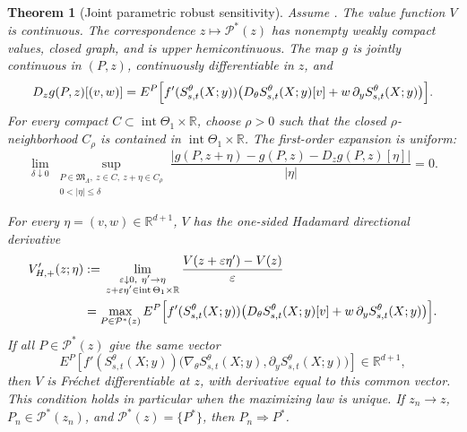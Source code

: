 \documentclass[11pt,reqno]{amsart}
\theoremstyle{plain}
\newtheorem{theorem}{Theorem}[section]
\theoremstyle{definition}
\newcommand{\R}{\mathbb R}
\newcommand{\cP}{\mathcal P}
\newcommand{\eps}{\varepsilon}
\newcommand{\abs}[1]{\left\lvert #1\right\rvert}
\begin{document}
\begin{theorem}[Joint parametric robust sensitivity]
\label{thm:parametric-robust-sensitivity}
Assume .  The value function \(V\) is continuous.  The
correspondence \(z\mapsto\cP^*(z)\) has nonempty weakly compact values,
closed graph, and is upper hemicontinuous.  The map \(g\) is jointly
continuous in \((P,z)\), continuously differentiable in \(z\), and
\begin{align}
  D_zg(P,z)[(v,w)]
  =E^P\Bigl[
    f'(S_{s,t}^\theta(X;y))
    \bigl(
      D_\theta S_{s,t}^\theta(X;y)[v]
      +w\,\partial_yS_{s,t}^\theta(X;y)
    \bigr)
  \Bigr].
  \label{eq:joint-modelwise-sensitivity}
\end{align}
For every compact
\(C\subset\operatorname{int}\Theta_1\times\R\), choose \(\rho>0\) such that
the closed \(\rho\)-neighborhood \(C_\rho\) is contained in
\(\operatorname{int}\Theta_1\times\R\).  The first-order expansion is
uniform:
\begin{equation}\label{eq:uniform-payoff-Frechet}
  \lim_{\delta\downarrow0}
  \sup_{\substack{P\in\mathfrak M_\Lambda,\ z\in C,\ z+\eta\in C_\rho\\
  0<\abs{\eta}\le\delta}}
  \frac{\abs{g(P,z+\eta)-g(P,z)-D_zg(P,z)[\eta]}}{\abs{\eta}}=0.
\end{equation}

For every \(\eta=(v,w)\in\R^{d+1}\), \(V\) has the one-sided Hadamard
directional derivative
\begin{align}
  V'_{H,+}(z;\eta)
  &:={}
  \lim_{\substack{\eps\downarrow0,\ \eta'\to\eta\\
  z+\eps\eta'\in\operatorname{int}\Theta_1\times\R}}
  \frac{V(z+\eps\eta')-V(z)}{\eps}
  \notag\\
  &=\max_{P\in\cP^*(z)}
  E^P\Bigl[
    f'(S_{s,t}^\theta(X;y))
    \bigl(
      D_\theta S_{s,t}^\theta(X;y)[v]
      +w\,\partial_yS_{s,t}^\theta(X;y)
    \bigr)
  \Bigr].
  \label{eq:joint-Danskin}
\end{align}
If all \(P\in\cP^*(z)\) give the same vector
\begin{equation}\label{eq:common-active-gradient}
  E^P\left[
    f'(S_{s,t}^\theta(X;y))
    \bigl(
      \nabla_\theta S_{s,t}^\theta(X;y),
      \partial_yS_{s,t}^\theta(X;y)
    \bigr)
  \right]\in\R^{d+1},
\end{equation}
then \(V\) is Fr\'echet differentiable at \(z\), with derivative equal to
this common vector.  This condition holds in particular when the maximizing
law is unique.  If \(z_n\to z\), \(P_n\in\cP^*(z_n)\), and
\(\cP^*(z)=\{P^*\}\), then \(P_n\Rightarrow P^*\).
\end{theorem}
\end{document}
